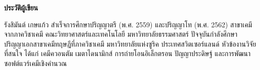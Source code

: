 

{
\thispagestyle{empty}

\begin{center}
    \LARGE\textbf{ประวัติผู้เขียน}
\end{center}

รังสิมันต์ เกษแก้ว สำเร็จการศึกษาปริญญาตรี (พ.ศ. 2559) และปริญญาโท (พ.ศ. 2562) สาขาเคมี จากภาควิชาเคมี 
คณะวิทยาศาสตร์และเทคโนโลยี มหาวิทยาลัยธรรมศาสตร์ ปัจจุบันกำลังศึกษาปริญญาเอกสาขาเคมีทฤษฎีที่ภาควิชาเคมี มหาวิทยาลัยแห่งซูริค 
ประเทศสวิตเซอร์แลนด์ หัวข้องานวิจัยที่สนใจ ได้แก่ เคมีควอนตัม เมตาไดนามิกส์ การถ่ายโอนอิเล็กตรอน ปัญญาประดิษฐ์ 
และการพัฒนาซอฟต์แวร์เคมีเชิงคำนวณ

\leavevmode
\vspace{-1.5em}

\begin{comment}
\noindent ประสบการณ์การทำงาน
\vspace{-1em}
\begin{flushleft}
\begin{table}[htbp]
    \resizebox{\textwidth}{!}{%
    \begin{tabular}{ll}
        $\bullet$ พ.ศ. 2562-2563 &ที่ปรึกษาบริษัท New Equilibrium Biosciences, Boston, MA \\
        $\bullet$ พ.ศ. 2564 &ที่ปรึกษาบริษัท ติ๊งกิ้ง แมชชีนส์ จำกัด (Thinking Machines) \\
        $\bullet$ พ.ศ. 2564 &คณะกรรมการจัดการแข่งขันปัญญาประดิษฐ์สําหรับเคมีแห่งประเทศไทย (TMLCC) \\
        $\bullet$ พ.ศ. 2564 &คณะกรรมการจัดงาน PyCon Thailand และ PyCon APAC 2021 \\
        $\bullet$ พ.ศ. 2565 &นักเขียนบทความบริษัท คลาวด์ เอชเอ็ม จำกัด (Cloud HM)
    \end{tabular}
    }
\end{table}
\end{flushleft}

\vspace{-2em}


\end{comment}}
